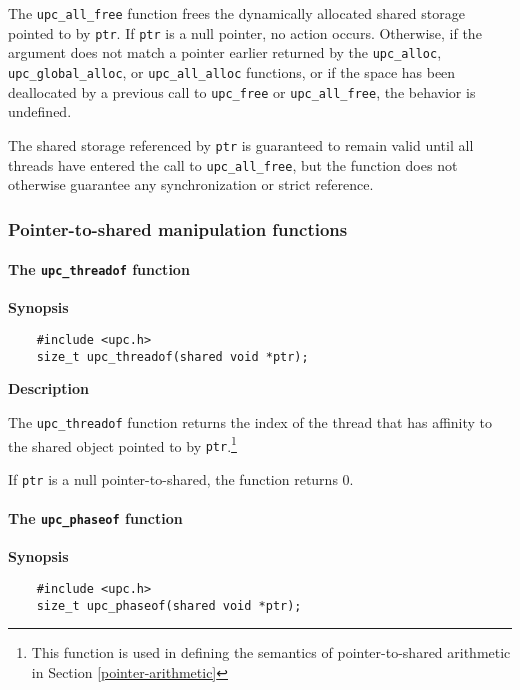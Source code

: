 \np The {\tt upc\_all\_free} function frees the dynamically
    allocated shared storage pointed to by {\tt ptr}.  If {\tt ptr} is
    a null pointer, no action occurs.  Otherwise, if the argument does
    not match a pointer earlier returned by the {\tt upc\_alloc},
    {\tt upc\_global\_alloc},  or {\tt upc\_all\_alloc} functions,
    or if the space has been deallocated by a previous call to {\tt upc\_free}
    or {\tt upc\_all\_free}, the behavior is undefined.

\np The shared storage referenced by {\tt ptr} is guaranteed to remain valid
    until all threads have entered the call to {\tt upc\_all\_free}, but the
    function does not otherwise guarantee any synchronization or strict reference.

\cbend

\subsubsection{Pointer-to-shared manipulation functions}

\paragraph{The {\tt upc\_threadof} function}
\label{upc_threadof}

{\bf Synopsis} 

\npf\vspace{-2.5em}
\begin{verbatim}
    #include <upc.h> 
    size_t upc_threadof(shared void *ptr); 
\end{verbatim}

{\bf Description}

\np The {\tt upc\_threadof} function returns the index of the
   thread that has affinity to the shared object pointed to by {\tt ptr}.\footnote{%
   This function is used in defining the semantics of pointer-to-shared
   arithmetic in Section \ref{pointer-arithmetic}}

\np If {\tt ptr} is a null pointer-to-shared, the function returns 0.


\paragraph{The {\tt upc\_phaseof} function}
\label{upc_phaseof}

{\bf Synopsis} 

\npf\vspace{-2.5em}
\begin{verbatim}
    #include <upc.h> 
    size_t upc_phaseof(shared void *ptr); 
\end{verbatim}

